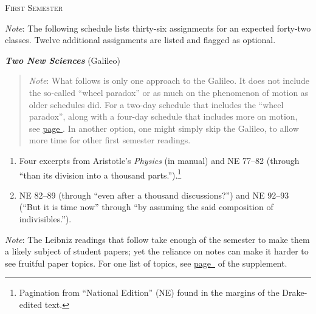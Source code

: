 \documentclass[10pt]{article}
\begin{document}
\newpage

\begin{center}
  \textsc{\small{First Semester}}
\end{center} 
\label{First}
{\small \emph{Note}: The following schedule 
lists thirty-six assignments for an expected forty-two classes.
Twelve additional assignments are listed and flagged as optional.}

\textbf{\emph{Two New Sciences}} (Galileo)
  \begin{quote}
    \small{\emph{Note}: What follows is only one approach to the Galileo.
    It does not include the so-called ``wheel paradox'' 
    or as much on the phenomenon of motion 
    as older schedules did.  
    For a two-day schedule that includes 
    the ``wheel paradox'', along with a four-day schedule
    that includes more on motion,
    see \hyperref[Galileo]{page \pageref{Galileo}}.
    In another option, one might simply skip the Galileo,
    to allow more time for other first semester readings.} 
  \end{quote}
  \begin{enumerate}[noitemsep]
    \item Four excerpts from Aristotle's \emph{Physics}
		(in manual) and NE 77--82 (through ``than
		its division into a thousand
		parts.'').\footnote{Pagination from
			``National Edition'' (NE) found in
			the margins of the Drake-edited
			text.} \item  NE 82--89 (through
		``even after a thousand discussions?'') and
		NE 92--93 (``But it is time now'' through
		``by assuming the said composition of
		indivisibles.'').  \end{enumerate}

{\small\emph{Note}: The Leibniz readings that follow take enough of
	the semester to make them a likely subject of student
	papers; yet the reliance on notes can make it
	harder to see fruitful paper topics. For one list
	of topics, see
	\hyperref[supple.58]{page~\pageref{supple.58}} of
	the 
	supplement.}
\end{document}
